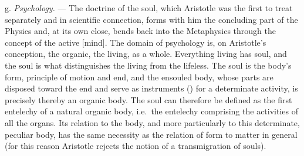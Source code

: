 \divrule

g. \emph{Psychology.} --- The doctrine of the soul, which Aristotle was the first to treat separately and in scientific connection, forms with him the concluding part of the Physics and, at its own close, bends back into the Metaphysics through the concept of the active  [mind]. The domain of psychology is, on Aristotle's conception, the organic, the living, as a whole. Everything living has soul, and the soul is what distinguishes the living from the lifeless. The soul is the body's form, principle of motion and end, and the ensouled body, whose parts are disposed toward the end and serve as instruments () for a determinate activity, is precisely thereby an organic body. The soul can therefore be defined as the first entelechy of a natural organic body, i.e.\ the entelechy comprising the activities of all the organs. Its relation to the body, and more particularly to this determinate, peculiar body, has the same necessity as the relation of form to matter in general (for this reason Aristotle rejects the notion of a transmigration of souls).

